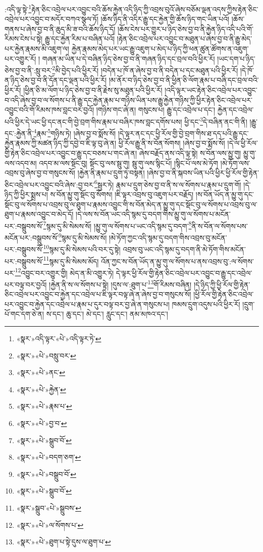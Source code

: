 :འདི་ལྟ་སྟེ་\footnote{«སྣར་»འདི་ལྟར་«པེ་»འདི་ལྟར་ཏེ་}རྟེན་ཅིང་འབྲེལ་པར་འབྱུང་བའི་ཆོས་རྐྱེན་འདི་ཉིད་ཀྱི་འབྲས་བུའོ་ཞེས་བཅོམ་ལྡན་འདས་ཀྱིས་རྟེན་ཅིང་འབྲེལ་པར་འབྱུང་བ་མདོར་བཀའ་སྩལ་ཏོ། །ཆོས་ཉིད་ནི་འདིར་རྒྱུ་དང་རྐྱེན་གྱི་ཆོས་ཉིད་གང་ཡིན་པའོ། །ཆོས་གནས་པ་ཞེས་བྱ་བ་ནི་ཆུད་མི་ཟ་བའི་ཆོས་ཉིད་དོ། །ཆོས་ངེས་པར་གྱུར་པ་ཉིད་ཅེས་བྱ་བ་ནི་རྐྱེན་ཉིད་འདི་པའི་གོ་རིམས་ངེས་པ་སྟེ། རྒྱུ་དང་རྐྱེན་རིམ་པ་བཞིན་པའོ། །རྟེན་ཅིང་འབྲེལ་པར་འབྱུང་བ་མཐུན་པ་ཞེས་བྱ་བ་ནི་རྒྱུ་མེད་པར་རྐྱེན་རྣམས་མི་འཇུག་ལ། རྐྱེན་རྣམས་མེད་པར་ཡང་རྒྱུ་འཇུག་པ་མེད་པ་ཉིད་ཀྱི་ཕན་ཚུན་ཚོགས་ན་འཇུག་པར་འགྱུར་རོ། །
གཞན་མ་ཡིན་པ་དེ་བཞིན་ཉིད་ཅེས་བྱ་བ་ནི་གཞན་ཉིད་དང་བྲལ་བའི་ཕྱིར་རོ། །ཡང་དག་པ་ཉིད་ཅེས་བྱ་བ་ནི་:སླུ་བར་\footnote{«སྣར་»«པེ་»བསླུ་བར་}མི་བྱེད་པའི་ཕྱིར་རོ། །བདེན་པ་ཁོ་ན་ཞེས་བྱ་བ་ནི་བདེན་པ་དང་མཐུན་པའི་ཕྱིར་རོ། །དེ་ཁོ་ན་ཉིད་ཅེས་བྱ་བ་ནི་དོན་དང་ལྡན་པའི་ཕྱིར་རོ། །མ་ནོར་བ་ཉིད་ཅེས་བྱ་བ་ནི་ཕྱིན་ཅི་ལོག་རྣམ་པ་བཞི་དང་བྲལ་བའི་ཕྱིར་རོ། །ཕྱིན་ཅི་མ་ལོག་པ་ཉིད་ཅེས་བྱ་བ་ནི་རྗེས་སུ་མཐུན་པའི་ཕྱིར་རོ། །འདི་ལྟར་ཡང་རྟེན་ཅིང་འབྲེལ་པར་འབྱུང་བ་འདི་ཞེས་བྱ་བ་ལ་སོགས་པ་ནི་རྒྱུ་དང་རྐྱེན་རྣམ་པ་གཉིས་ཡིན་པས་རྒྱུ་རྐྱེན་གཉིས་ཀྱི་ཕྱིར་རྟེན་ཅིང་འབྲེལ་པར་འབྱུང་བའི་གོ་རིམས་ཁས་བླང་བར་བྱའོ། །གཉིས་གང་ཞེ་ན། གསུངས་པ། རྒྱུ་དང་འབྲེལ་པ་དང་། རྐྱེན་དང་འབྲེལ་པའི་ཕྱིར་དེ་ཡང་ཕྱི་དང་ནང་གི་བྱེ་བྲག་གིས་རྣམ་པ་བཞིར་ཁས་བླང་དགོས་པས། ཕྱི་དང་\footnote{«སྣར་»«པེ་»ནང་}དེ་བཞིན་ནང་གི་ནི། །རྒྱུ་དང་:རྐྱེན་ནི་\footnote{«སྣར་»«པེ་»རྐྱེན་}རྣམ་\footnote{«སྣར་»«པེ་»རྣམ་པ་}གཉིས་ཏེ། །ཞེས་བྱ་བ་སྨོས་སོ། །དེ་ལྟར་ནང་དང་ཕྱི་རོལ་གྱི་བྱེ་བྲག་གིས་ཐ་དད་པའི་རྒྱུ་དང་རྐྱེན་རྣམས་ཀྱི་མཚན་ཉིད་ཀྱི་དབྱེ་བ་ཇི་ལྟ་བུ་ཞེ་ན། ཕྱི་རོལ་རྒྱུ་ནི་ས་བོན་སོགས། །ཞེས་བྱ་བ་སྨོས་སོ། །དེ་ལ་ཕྱི་རོལ་གྱི་རྟེན་ཅིང་འབྲེལ་པར་འབྱུང་བ་རྒྱུ་དང་བཅས་པ་གང་ཞེ་ན། ཞེས་བརྗོད་ནས་འདི་ལྟ་སྟེ། ས་བོན་ལས་མྱུ་གུ། མྱུ་གུ་ལས་འདབ་མ། འདབ་མ་ལས་སྡོང་བུ། སྡོང་བུ་ལས་སྦུ་གུ། སྦུ་གུ་ལས་སྙིང་པོ། །སྙིང་པོ་ལས་མེ་ཏོག །མེ་ཏོག་ལས་འབྲས་བུ་ཞེས་བྱ་བ་གསུངས་སོ། །རྐྱེན་ནི་རྣམ་པ་དྲུག་ཏུ་བསྟན། །ཞེས་བྱ་བ་ནི་སྐབས་ཡིན་པའི་ཕྱིར་ཕྱི་རོལ་གྱི་རྟེན་ཅིང་འབྲེལ་པར་འབྱུང་བའི་ཞེས་:བྱ་བར་\footnote{«སྣར་»«པེ་»བྱ་བ་}སྦྱར་ཏེ། རྣམ་པ་དྲུག་ཅེས་བྱ་བ་ནི་ས་ལ་སོགས་པ་རྣམ་པ་དྲུག་གོ། །དེ་ཉིད་ཀྱི་ཕྱིར་སྨྲས་པ། ས་བོན་མྱུ་གུ་སྡོང་བུ་སོགས། །ཇི་ལྟར་འབྲས་བུ་འཇུག་པར་བརྗོད། །ས་བོན་ཡོད་ན་མྱུ་གུ་དང་སྡོང་བུ་ལ་སོགས་པ་འབྲས་བུ་ལ་ཐུག་པ་རྣམས་འབྱུང་གི་ས་བོན་མེད་ན་མྱུ་གུ་དང་སྡོང་བུ་ལ་སོགས་པ་འབྲས་བུ་ལ་ཐུག་པ་རྣམས་འབྱུང་བ་མེད་དོ། །དེ་ལས་ས་བོན་ཡང་འདི་སྙམ་དུ་བདག་གིས་མྱུ་གུ་ལ་སོགས་པ་མངོན་པར་:བསྒྲུབས་སོ་\footnote{«སྣར་»«པེ་»སྒྲུབ་བོ་}སྙམ་དུ་མི་སེམས་སོ། །མྱུ་གུ་ལ་སོགས་པ་ཡང་འདི་སྙམ་དུ་བདག་\footnote{«སྣར་»«པེ་»བདག་ཅག་}ནི་ས་བོན་ལ་སོགས་པས་མངོན་པར་:བསྒྲུབས་སོ་\footnote{«སྣར་»«པེ་»བསྒྲུབ་བོ་}སྙམ་དུ་མི་སེམས་སོ། །མེ་ཏོག་ཀྱང་འདི་སྙམ་དུ་བདག་གིས་འབྲས་བུ་མངོན་པར་:བསྒྲུབས་སོ་\footnote{«སྣར་»«པེ་»སྒྲུབ་བོ་}སྙམ་དུ་མི་སེམས་པའི་བར་དུ་སྟེ། འབྲས་བུ་ཡང་འདི་སྙམ་དུ་བདག་ནི་མེ་ཏོག་གིས་མངོན་པར་:བསྒྲུབས་སོ་\footnote{«སྣར་»སྒྲུབ་«པེ་»སྒྲུབས་}སྙམ་དུ་མི་སེམས་མོད། འོན་ཀྱང་ས་བོན་ཡོད་ན་མྱུ་གུ་ལ་སོགས་པ་ནས་འབྲས་བུ་:ལ་སོགས་པར་\footnote{«སྣར་»«པེ་»ལ་སོགས་པ་}འབྱུང་བར་འགྱུར་གྱི། མེད་ན་མི་འགྱུར་ཏེ། དེ་ལྟར་ཕྱི་རོལ་གྱི་རྟེན་ཅིང་འབྲེལ་པར་འབྱུང་བ་རྒྱུ་དང་འབྲེལ་པར་བལྟ་བར་བྱའོ། །རྐྱེན་ནི་ས་ལ་སོགས་པ་སྟེ། །དུས་ལ་:ཐུག་པ་\footnote{«སྣར་»«པེ་»ཐུག་པ་སྟེ་དུས་ལ་ཐུག་པ་}གོ་རིམས་བཞིན། །དེ་ཉིད་ཀྱི་ཕྱི་རོལ་གྱི་རྟེན་ཅིང་འབྲེལ་པར་འབྱུང་བ་རྐྱེན་དང་འབྲེལ་པ་ཇི་ལྟར་བལྟ་ཞེ་ན་ཞེས་བྱ་བ་གསུངས་སོ། །ཕྱི་རོལ་གྱི་རྟེན་ཅིང་འབྲེལ་པར་འབྱུང་བ་རྐྱེན་དང་འབྲེལ་པ་རྣམ་པ་དུར་བལྟ་བར་བྱ་ཞེ་ན་གསུངས་པ། ཁམས་དྲུག་འདུས་པའི་ཕྱིར་རོ། །དྲུག་པོ་གང་དག་ཅེ་ན། ས་དང་། ཆུ་དང་། མེ་དང་། རླུང་དང་། ནམ་མཁའ་དང་། 